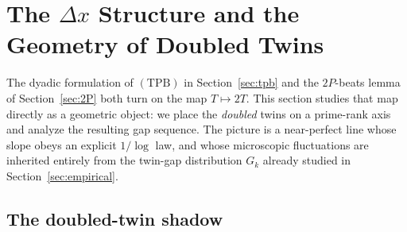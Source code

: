 %
%
%
%
%

\section{The \texorpdfstring{$\Delta x$}{Delta x} Structure and the Geometry of Doubled Twins}\label{sec:deltax}

The dyadic formulation of $(\mathrm{TPB})$ in Section~\ref{sec:tpb} and the
$2P$-beats lemma of Section~\ref{sec:2P} both turn on the map $T\mapsto 2T$.
This section studies that map directly as a geometric object: we place the
\emph{doubled} twins on a prime-rank axis and analyze the resulting gap
sequence. The picture is a near-perfect line whose slope obeys an explicit
$1/\log$ law, and whose microscopic fluctuations are inherited entirely from
the twin-gap distribution $G_k$ already studied in
Section~\ref{sec:empirical}.

\subsection{The doubled-twin shadow}\label{sec:deltax-def}

